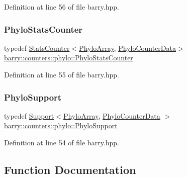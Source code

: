 Definition at line 56 of file barry.\+hpp.

\mbox{\label{namespacebarry_1_1counters_1_1phylo_abfefb6cff81a19d278b306a79cc011a3}} 
\subsubsection{\texorpdfstring{Phylo\+Stats\+Counter}{PhyloStatsCounter}}
{\footnotesize\ttfamily typedef \hyperlink{classbarry_1_1_stats_counter}{Stats\+Counter}$<$\hyperlink{namespacebarry_1_1counters_1_1phylo_a50a6652c16ff57d76b4099043d6a0bbb}{Phylo\+Array}, \hyperlink{namespacebarry_1_1counters_1_1phylo_a6ecc0d8ab76f8dc2db152221a8e9e95a}{Phylo\+Counter\+Data}$>$ \hyperlink{namespacebarry_1_1counters_1_1phylo_abfefb6cff81a19d278b306a79cc011a3}{barry\+::counters\+::phylo\+::\+Phylo\+Stats\+Counter}}



Definition at line 55 of file barry.\+hpp.

\mbox{\label{namespacebarry_1_1counters_1_1phylo_a40ee9e679f0f95fdeeb18cd0a2e45d48}} 
\subsubsection{\texorpdfstring{Phylo\+Support}{PhyloSupport}}
{\footnotesize\ttfamily typedef \hyperlink{classbarry_1_1_support}{Support}$<$\hyperlink{namespacebarry_1_1counters_1_1phylo_a50a6652c16ff57d76b4099043d6a0bbb}{Phylo\+Array}, \hyperlink{namespacebarry_1_1counters_1_1phylo_a6ecc0d8ab76f8dc2db152221a8e9e95a}{Phylo\+Counter\+Data} $>$ \hyperlink{namespacebarry_1_1counters_1_1phylo_a40ee9e679f0f95fdeeb18cd0a2e45d48}{barry\+::counters\+::phylo\+::\+Phylo\+Support}}



Definition at line 54 of file barry.\+hpp.



\subsection{Function Documentation}
\mbox{\label{namespacebarry_1_1counters_1_1phylo_ac5dde4b651c7600bd8533c2db9a66632}} 
